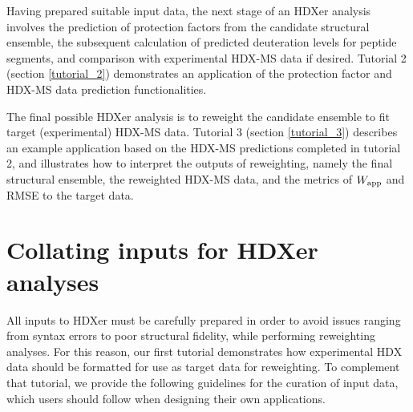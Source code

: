 \documentclass[9pt,tutorial]{livecoms}
\begin{document}
Having prepared suitable input data, the next stage of an HDXer analysis involves the prediction of protection factors from the candidate structural ensemble, the subsequent calculation of predicted deuteration levels for peptide segments, and comparison with experimental HDX-MS data if desired.
Tutorial 2 (section \ref{tutorial_2}) demonstrates an application of the protection factor and HDX-MS data prediction functionalities.

The final possible HDXer analysis is to reweight the candidate ensemble to fit target (experimental) HDX-MS data.
Tutorial 3 (section \ref{tutorial_3}) describes an example application based on the HDX-MS predictions completed in tutorial 2, and illustrates how to interpret the outputs of reweighting, namely the final structural ensemble, the reweighted HDX-MS data, and the metrics of $W_\textnormal{app}$ and RMSE to the target data. 

\section{Collating inputs for HDXer analyses}\label{collating_inputs}
All inputs to HDXer must be carefully prepared in order to avoid issues ranging from syntax errors to poor structural fidelity, while performing reweighting analyses. 
For this reason, our first tutorial demonstrates how experimental HDX data should be formatted for use as target data for reweighting.
To complement that tutorial, we provide the following guidelines for the curation of input data, which users should follow when designing their own applications.
\end{document}
